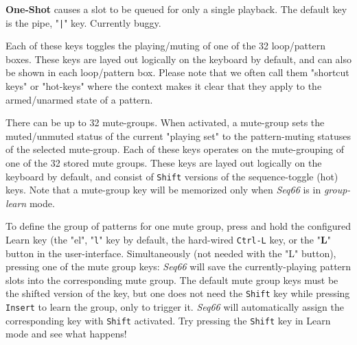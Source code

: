    \textbf{One-Shot}
   causes a slot to be queued for only a single playback.
   The default key is the pipe, "\texttt{|}" key.
   Currently buggy.

   Each of these keys toggles the playing/muting of one of the 32
   loop/pattern boxes.
   These keys are layed out logically on the keyboard by default,
   and can also be shown in each loop/pattern box.
   Please note that we often call them "shortcut keys" or "hot-keys"
   where the context
   makes it clear that they apply to the armed/unarmed state of a pattern.

   There can be up to 32 mute-groups.
   When activated, a mute-group
   sets the muted/unmuted status of the current "playing set"
   to the pattern-muting statuses of the selected mute-group.
   Each of these keys operates on the mute-grouping of one of the 32
   stored mute groups.
   These keys are layed out logically on the keyboard by default, and consist
   of \texttt{Shift} versions of the sequence-toggle (hot) keys.
   Note that a mute-group key will be memorized only when
   \textsl{Seq66} is in
   \textsl{group-learn} mode.



   To define the group of patterns for one mute group, press and hold the
   configured Learn key (the "el", "\texttt{l}" key by default,
   the hard-wired \texttt{Ctrl-L} key, or the "\textbf{L}"
   button in the user-interface.
   Simultaneously (not needed with the "L" button),
   pressing one of the mute group keys: \textsl{Seq66}
   will save the currently-playing pattern slots into the corresponding mute
   group.
   The default mute group keys must be the shifted version of the key,
   but one does not need the \texttt{Shift} key while pressing
   \texttt{Insert} to learn the group, only to trigger it.
   \textsl{Seq66} will automatically assign the corresponding key with
   \texttt{Shift} activated.  Try pressing the \texttt{Shift} key in Learn mode
   and see what happens!


